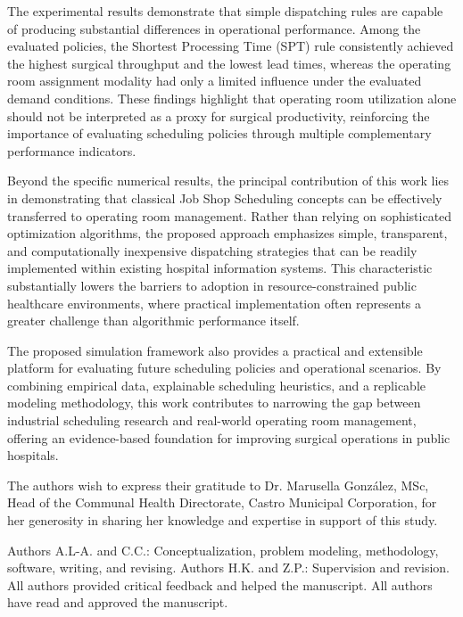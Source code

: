\documentclass[sn-mathphys-num]{sn-jnl}
\begin{document}
The experimental results demonstrate that simple dispatching rules are capable of producing substantial differences in operational performance. Among the evaluated policies, the Shortest Processing Time (SPT) rule consistently achieved the highest surgical throughput and the lowest lead times, whereas the operating room assignment modality had only a limited influence under the evaluated demand conditions. These findings highlight that operating room utilization alone should not be interpreted as a proxy for surgical productivity, reinforcing the importance of evaluating scheduling policies through multiple complementary performance indicators.

Beyond the specific numerical results, the principal contribution of this work lies in demonstrating that classical Job Shop Scheduling concepts can be effectively transferred to operating room management. Rather than relying on sophisticated optimization algorithms, the proposed approach emphasizes simple, transparent, and computationally inexpensive dispatching strategies that can be readily implemented within existing hospital information systems. This characteristic substantially lowers the barriers to adoption in resource-constrained public healthcare environments, where practical implementation often represents a greater challenge than algorithmic performance itself.

The proposed simulation framework also provides a practical and extensible platform for evaluating future scheduling policies and operational scenarios. By combining empirical data, explainable scheduling heuristics, and a replicable modeling methodology, this work contributes to narrowing the gap between industrial scheduling research and real-world operating room management, offering an evidence-based foundation for improving surgical operations in public hospitals.
 

\backmatter

The authors wish to express their gratitude to Dr. Marusella González, MSc, Head of the Communal Health Directorate, Castro Municipal Corporation, for her generosity in sharing her knowledge and expertise in support of this study.

Authors A.L-A. and C.C.: Conceptualization, problem modeling, methodology, software, writing, and revising. Authors H.K. and Z.P.: Supervision and revision. All authors provided critical feedback and helped the manuscript. All authors have read and approved the manuscript. 
\end{document}
